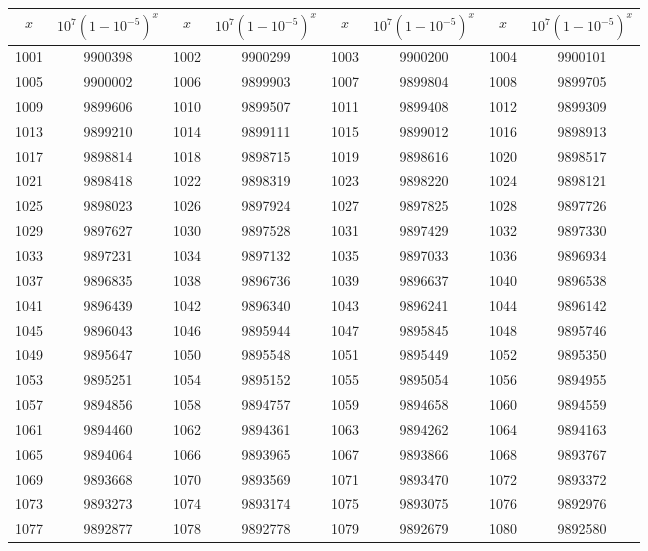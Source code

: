 \documentclass{exam}
\begin{document}
\begin{figure}
\begin{tabular}{|c|c||c|c||c|c||c|c|}
\hline
$x$ & $10^7(1-10^{-5})^x$ & $x$ & $10^7(1-10^{-5})^x$ & $x$ & $10^7(1-10^{-5})^x$ & $x$ & $10^7(1-10^{-5})^x$ \\
\hline
\hline

1001 & 9900398 &1002 & 9900299 &1003 & 9900200 &1004 & 9900101 \\
\hline
1005 & 9900002 &1006 & 9899903 &1007 & 9899804 &1008 & 9899705 \\
\hline
1009 & 9899606 &1010 & 9899507 &1011 & 9899408 &1012 & 9899309 \\
\hline
1013 & 9899210 &1014 & 9899111 &1015 & 9899012 &1016 & 9898913 \\
\hline
1017 & 9898814 &1018 & 9898715 &1019 & 9898616 &1020 & 9898517 \\
\hline
1021 & 9898418 &1022 & 9898319 &1023 & 9898220 &1024 & 9898121 \\
\hline
1025 & 9898023 &1026 & 9897924 &1027 & 9897825 &1028 & 9897726 \\
\hline
1029 & 9897627 &1030 & 9897528 &1031 & 9897429 &1032 & 9897330 \\
\hline
1033 & 9897231 &1034 & 9897132 &1035 & 9897033 &1036 & 9896934 \\
\hline
1037 & 9896835 &1038 & 9896736 &1039 & 9896637 &1040 & 9896538 \\
\hline
1041 & 9896439 &1042 & 9896340 &1043 & 9896241 &1044 & 9896142 \\
\hline
1045 & 9896043 &1046 & 9895944 &1047 & 9895845 &1048 & 9895746 \\
\hline
1049 & 9895647 &1050 & 9895548 &1051 & 9895449 &1052 & 9895350 \\
\hline
1053 & 9895251 &1054 & 9895152 &1055 & 9895054 &1056 & 9894955 \\
\hline
1057 & 9894856 &1058 & 9894757 &1059 & 9894658 &1060 & 9894559 \\
\hline
1061 & 9894460 &1062 & 9894361 &1063 & 9894262 &1064 & 9894163 \\
\hline
1065 & 9894064 &1066 & 9893965 &1067 & 9893866 &1068 & 9893767 \\
\hline
1069 & 9893668 &1070 & 9893569 &1071 & 9893470 &1072 & 9893372 \\
\hline
1073 & 9893273 &1074 & 9893174 &1075 & 9893075 &1076 & 9892976 \\
\hline
1077 & 9892877 &1078 & 9892778 &1079 & 9892679 &1080 & 9892580 \\

\end{tabular}
\end{figure}
\end{document}
